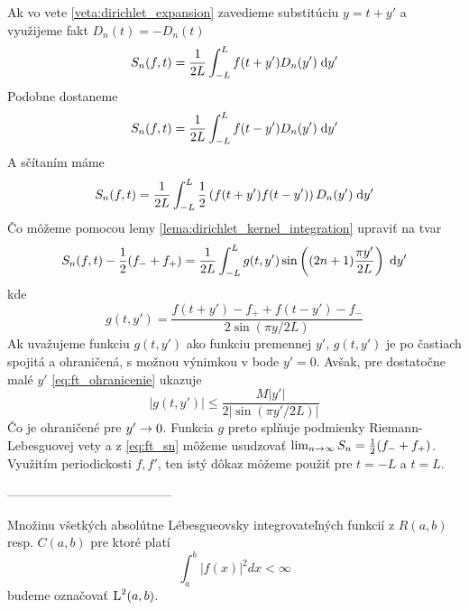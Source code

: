 \begin{dokaz}
    Ak vo vete \ref{veta:dirichlet_expansion} zavedieme substitúciu
    $y=t+y'$ a využijeme fakt $D_n(t)=-D_n(t)$
    \begin{equation}
        S_n(f,t) = \frac{1}{2L} \int_{-L}^{L} f(t+y') D_n(y') \; \mathrm{d} y'
    \end{equation}
    Podobne dostaneme
    \begin{equation}
        S_n(f,t) = \frac{1}{2L} \int_{-L}^{L} f(t-y') D_n(y') \; \mathrm{d} y'
    \end{equation}
    A sčítaním máme
    \begin{equation}
        S_n(f,t) = \frac{1}{2L} \int_{-L}^{L} \frac{1}{2} 
            \left( f(t+y') f(t-y') \right) D_n(y') \; \mathrm{d} y'
    \end{equation}
    Čo môžeme pomocou lemy \ref{lema:dirichlet_kernel_integration}
    upraviť na tvar
    \begin{equation}
    S_n(f,t) - \frac{1}{2}(f_-+f_+)= \frac{1}{2L} \int_{-L}^{L} 
        g(t,y') \sin\left( (2n+1)\frac{\pi y'}{2L} \right)\; \mathrm{d} y'
        \label{eq:ft_sn}
    \end{equation}
    kde
    \begin{equation}
        g(t,y') = \frac{f(t+y')-f_+ + f(t-y')-f_-}{2 \sin(\pi y/ 2L)}
    \end{equation}
    Ak uvažujeme funkciu $g(t,y')$ ako funkciu premennej $y'$,
    $g(t,y')$ je po častiach spojitá a ohraničená, s možnou výnimkou
    v bode $y'=0$. Avšak, pre dostatočne malé $y'$ \ref{eq:ft_ohranicenie}
    ukazuje
    \begin{equation}
        |g(t,y')|\le \frac{M |y'|}{2|\sin(\pi y'/2L)|}
    \end{equation}
    Čo je ohraničené pre $y'\rightarrow 0$.
    Funkcia $g$ preto splňuje podmienky Riemann-Lebesguovej vety
    a z \ref{eq:ft_sn} môžeme usudzovať
    $\lim_{n\rightarrow\infty} S_n = \frac{1}{2}(f_- + f_+)$.
    Využitím periodickosti $f,f'$, ten istý dôkaz môžeme použiť pre
    $t=-L$ a $t=L$.
\end{dokaz}


---------------------------------------
\begin{definicia}

Množinu všetkých absolútne Lébesgueovsky integrovateľných funkcií z $R(a,b)$
resp. $C(a,b)$
pre ktoré platí
\begin{equation}
\int_a^b |f(x)|^2 dx < \infty
\end{equation}
budeme označovať $\mbox{L}^2(a,b)$.

\end{definicia}

